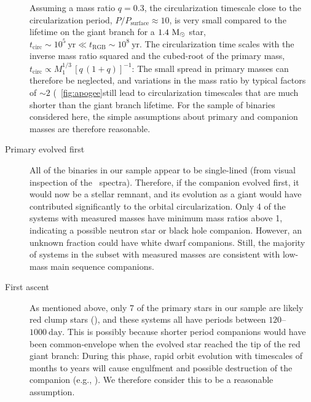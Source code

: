 \documentclass[modern, letterpaper]{aastex62}
\newcommand{\apogee}{\project{\acronym{APOGEE}}}
\newcommand{\Psurf}{\ensuremath{P_\textrm{surface}}}
\begin{document}
\begin{description}
    Assuming a mass ratio $q = 0.3$, the circularization timescale close to the
    circularization period, $P / \Psurf \approx 10$, is very small compared to
    the lifetime on the giant branch for a $1.4~\mathrm{M}_\odot$ star, $t_\textrm{circ}
    \sim 10^5~\textrm{yr} \ll t_\textrm{RGB} \sim 10^8~\textrm{yr}$.
    The circularization time scales with the inverse mass ratio squared and the
    cubed-root of the primary mass, $t_\textrm{circ} \propto M_1^{1/3} \, \left[
    q \, (1 + q) \right]^{-1}$:
    The small spread in primary masses can therefore be neglected, and
    variations in the mass ratio by typical factors of $\sim 2$
    (\figurename~\ref{fig:apogee}still lead to circularization timescales that
    are much shorter than the giant branch lifetime.
    For the sample of binaries considered here, the simple assumptions about
    primary and companion masses are therefore reasonable.
    \item[Primary evolved first] All of the binaries in our sample appear to be
    single-lined (from visual inspection of the \apogee\ spectra).
    Therefore, if the companion evolved first, it would now be a stellar
    remnant, and its evolution as a giant would have contributed significantly
    to the orbital circularization.
    Only 4 of the systems with measured masses have minimum mass ratios above 1,
    indicating a possible neutron star or black hole companion.
    However, an unknown fraction could have white dwarf companions.
    Still, the majority of systems in the subset with measured masses are
    consistent with low-mass main sequence companions.
    \item[First ascent] As mentioned above, only 7 of the primary stars in our
    sample are likely red clump stars (\citealt{Ting:2018}), and these systems
    all have periods between $120$--$1000~\textrm{day}$.
    This is possibly because shorter period companions would have been
    common-envelope when the evolved star reached the tip of the red giant
    branch: During this phase, rapid orbit evolution with timescales of months
    to years will cause engulfment and possible destruction of the companion
    (e.g., \citealt{Nordhaus:2010}).
    We therefore consider this to be a reasonable assumption.
\end{description}

%
%
\end{document}
